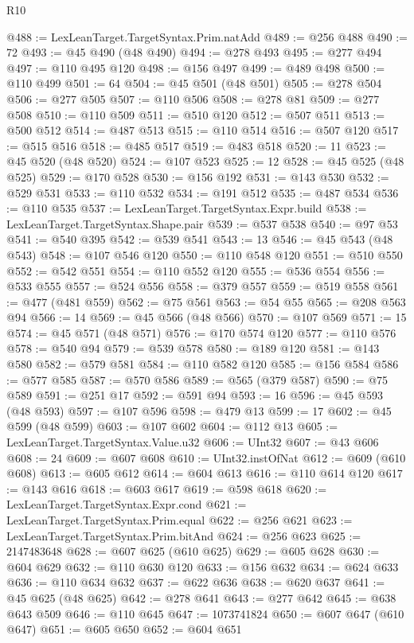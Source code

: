 \begin{lexlean}{R10}
\begin{coremodule}
{{{{{{{{{{{{{{{{{{{{{{{{{{{{{{{{{{{{{{{{{{{{{{{{{{{{{{{{{{{{{{{{{{{{{{{{{{{{{{{{{{{{@488 := LexLeanTarget.TargetSyntax.Prim.natAdd
@489 := @256 @488
@490 := 72
@493 := @45 @490 (@48 @490)
@494 := @278 @493
@495 := @277 @494
@497 := @110 @495 @120
@498 := @156 @497
@499 := @489 @498
@500 := @110 @499
@501 := 64
@504 := @45 @501 (@48 @501)
@505 := @278 @504
@506 := @277 @505
@507 := @110 @506
@508 := @278 @81
@509 := @277 @508
@510 := @110 @509
@511 := @510 @120
@512 := @507 @511
@513 := @500 @512
@514 := @487 @513
@515 := @110 @514
@516 := @507 @120
@517 := @515 @516
@518 := @485 @517
@519 := @483 @518
@520 := 11
@523 := @45 @520 (@48 @520)
@524 := @107 @523
@525 := 12
@528 := @45 @525 (@48 @525)
@529 := @170 @528
@530 := @156 @192
@531 := @143 @530
@532 := @529 @531
@533 := @110 @532
@534 := @191 @512
@535 := @487 @534
@536 := @110 @535
@537 := LexLeanTarget.TargetSyntax.Expr.build
@538 := LexLeanTarget.TargetSyntax.Shape.pair
@539 := @537 @538
@540 := @97 @53
@541 := @540 @395
@542 := @539 @541
@543 := 13
@546 := @45 @543 (@48 @543)
@548 := @107 @546 @120
@550 := @110 @548 @120
@551 := @510 @550
@552 := @542 @551
@554 := @110 @552 @120
@555 := @536 @554
@556 := @533 @555
@557 := @524 @556
@558 := @379 @557
@559 := @519 @558
@561 := @477 (@481 @559)
@562 := @75 @561
@563 := @54 @55
@565 := @208 @563 @94
@566 := 14
@569 := @45 @566 (@48 @566)
@570 := @107 @569
@571 := 15
@574 := @45 @571 (@48 @571)
@576 := @170 @574 @120
@577 := @110 @576
@578 := @540 @94
@579 := @539 @578
@580 := @189 @120
@581 := @143 @580
@582 := @579 @581
@584 := @110 @582 @120
@585 := @156 @584
@586 := @577 @585
@587 := @570 @586
@589 := @565 (@379 @587)
@590 := @75 @589
@591 := @251 @17
@592 := @591 @94
@593 := 16
@596 := @45 @593 (@48 @593)
@597 := @107 @596
@598 := @479 @13
@599 := 17
@602 := @45 @599 (@48 @599)
@603 := @107 @602
@604 := @112 @13
@605 := LexLeanTarget.TargetSyntax.Value.u32
@606 := UInt32
@607 := @43 @606
@608 := 24
@609 := @607 @608
@610 := UInt32.instOfNat
@612 := @609 (@610 @608)
@613 := @605 @612
@614 := @604 @613
@616 := @110 @614 @120
@617 := @143 @616
@618 := @603 @617
@619 := @598 @618
@620 := LexLeanTarget.TargetSyntax.Expr.cond
@621 := LexLeanTarget.TargetSyntax.Prim.equal
@622 := @256 @621
@623 := LexLeanTarget.TargetSyntax.Prim.bitAnd
@624 := @256 @623
@625 := 2147483648
@628 := @607 @625 (@610 @625)
@629 := @605 @628
@630 := @604 @629
@632 := @110 @630 @120
@633 := @156 @632
@634 := @624 @633
@636 := @110 @634 @632
@637 := @622 @636
@638 := @620 @637
@641 := @45 @625 (@48 @625)
@642 := @278 @641
@643 := @277 @642
@645 := @638 @643 @509
@646 := @110 @645
@647 := 1073741824
@650 := @607 @647 (@610 @647)
@651 := @605 @650
@652 := @604 @651
}}}}}}}}}}}}}}}}}}}}}}}}}}}}}}}}}}}}}}}}}}}}}}}}}}}}}}}}}}}}}}}}}}}}}}}}}}}}}}}}}}}}
\end{coremodule}
\end{lexlean}
